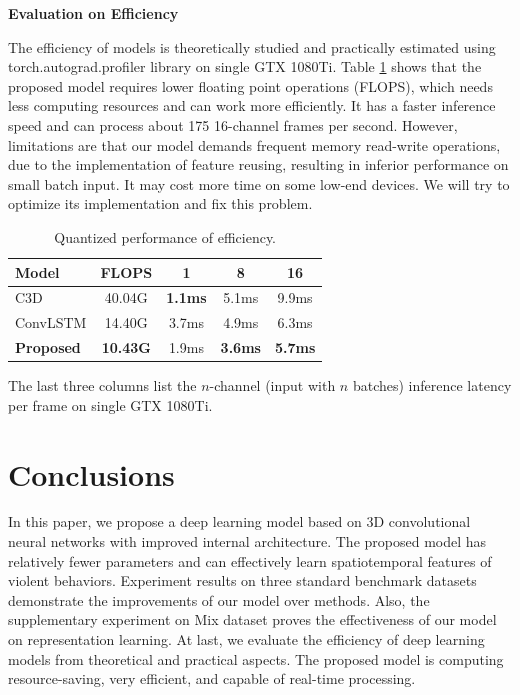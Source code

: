 \documentclass[10pt,twocolumn,letterpaper]{article}
\begin{document}
\noindent\textbf{Evaluation on Efficiency}

The efficiency of models is theoretically studied and practically estimated using torch.autograd.profiler library on single GTX 1080Ti.
Table \ref{table:efficiency} shows that the proposed model requires lower floating point operations (FLOPS), which needs less computing resources and can work more efficiently.
It has a faster inference speed and can process about 175 16-channel frames per second.
However, limitations are that our model demands frequent memory read-write operations, due to the implementation of feature reusing, resulting in inferior performance on small batch input.
It may cost more time on some low-end devices.
We will try to optimize its implementation and fix this problem.


\begin{table}
\begin{center}
\caption{Quantized performance of efficiency.}
\label{table:efficiency}
\begin{tabular}{lcccc}
\hline
\textbf{Model} & \textbf{FLOPS} & \textbf{1} & \textbf{8} & \textbf{16}\\
\hline\hline
C3D \cite{3dcnn_1} & 40.04G & \textbf{1.1ms} & 5.1ms & 9.9ms \\
ConvLSTM \cite{convlstm_sudh} & 14.40G & 3.7ms & 4.9ms & 6.3ms \\
\textbf{Proposed} & \textbf{10.43G} & 1.9ms & \textbf{3.6ms} & \textbf{5.7ms} \\
\hline
\end{tabular}
\end{center}
\footnotesize
The last three columns list the $n$-channel (\ie input with $n$ batches) inference latency per frame on single GTX 1080Ti.
\end{table}


\section{Conclusions}
\label{sec:5}

In this paper, we propose a deep learning model based on 3D convolutional neural networks with improved internal architecture. 
The proposed model has relatively fewer parameters and can effectively learn spatiotemporal features of violent behaviors. 
Experiment results on three standard benchmark datasets demonstrate the improvements of our model over methods. 
Also, the supplementary experiment on Mix dataset proves the effectiveness of our model on representation learning. 
At last, we evaluate the efficiency of deep learning models from theoretical and practical aspects.
The proposed model is computing resource-saving, very efficient, and capable of real-time processing. 
\end{document}
